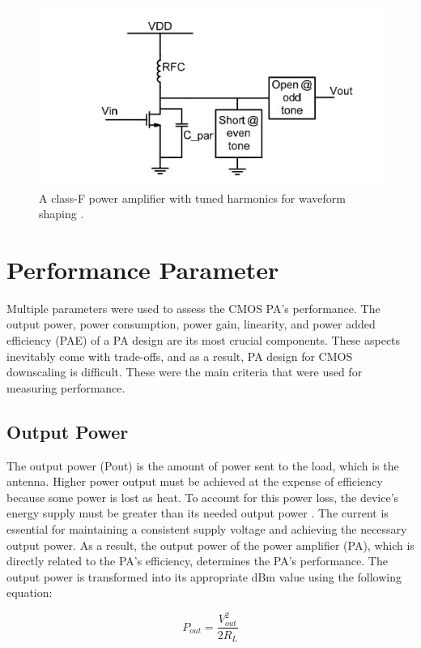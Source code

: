 \begin{figure}[h]
    \centering
    \includegraphics{figures/class-F.jpeg}
    \caption{A class-F power amplifier with tuned harmonics for waveform shaping \cite{twelveth}.}
    \label{fig:my_label}
\end{figure}
\section{Performance Parameter}
Multiple parameters were used to assess the CMOS PA's performance. The output power,
power consumption, power gain, linearity, and power added efficiency (PAE) of a PA design
are its most crucial components. These aspects inevitably come with trade-offs, and as a
result, PA design for CMOS downscaling is difficult. These were the main criteria that were
used for measuring performance.

\subsection{Output Power}
The output power (Pout) \cite{third} is the amount of power sent to the load, which is the antenna. Higher power output must be achieved at the expense of efficiency because some power is lost as heat. To account for this power loss, the device's energy supply must be greater than its needed output power \cite{fourtheen}. The current is essential for maintaining a consistent supply voltage and achieving the necessary output power. As a result, the output power of the power amplifier (PA), which is directly related to the PA's efficiency, determines the PA's performance. The output power is transformed into its appropriate dBm value using the following equation:

\begin{equation}
    P_{out}=\frac{V_{out}^2}{2R_L}
\end{equation}


